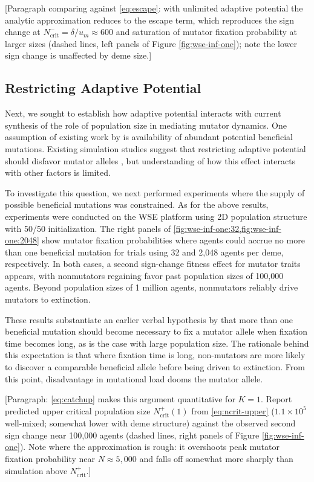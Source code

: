 [Paragraph comparing against \cref{eq:escape}: with unlimited adaptive potential the analytic approximation reduces to the escape term, which reproduces the sign change at $N_\mathrm{crit}^{-} = \delta / u_m \approx 600$ and saturation of mutator fixation probability at larger sizes (dashed lines, left panels of Figure \ref{fig:wse-inf-one}); note the lower sign change is unaffected by deme size.]

\subsection{Restricting Adaptive Potential}
\label{sec:restricting-adaptive-potential}

Next, we sought to establish how adaptive potential interacts with current synthesis of the role of population size in mediating mutator dynamics.
One assumption of existing work by \citet{raynes2018sign} is availability of abundant potential beneficial mutations.
Existing simulation studies suggest that restricting adaptive potential should disfavor mutator alleles \citep{tenaillon1999mutators}, but understanding of how this effect interacts with other factors is limited.

To investigate this question, we next performed experiments where the supply of possible beneficial mutations was constrained.
As for the above results, experiments were conducted on the WSE platform using 2D population structure with 50/50 initialization.
The right panels of \cref{fig:wse-inf-one:32,fig:wse-inf-one:2048} show mutator fixation probabilities where agents could accrue no more than one beneficial mutation for trials using 32 and 2,048 agents per deme, respectively.
In both cases, a second sign-change fitness effect for mutator traits appears, with nonmutators regaining favor past population sizes of 100,000 agents.
Beyond population sizes of 1 million agents, nonmutators reliably drive mutators to extinction.

These results substantiate an earlier verbal hypothesis by \citet{desai2011balance} that more than one beneficial mutation should become necessary to fix a mutator allele when fixation time becomes long, as is the case with large population size.
The rationale behind this expectation is that where fixation time is long, non-mutators are more likely to discover a comparable beneficial allele before being driven to extinction.
From this point, disadvantage in mutational load dooms the mutator allele.

[Paragraph: \cref{eq:catchup} makes this argument quantitative for $K = 1$. Report predicted upper critical population size $N_\mathrm{crit}^{+}(1)$ from \cref{eq:ncrit-upper} ($1.1 \times 10^5$ well-mixed; somewhat lower with deme structure) against the observed second sign change near 100,000 agents (dashed lines, right panels of Figure \ref{fig:wse-inf-one}). Note where the approximation is rough: it overshoots peak mutator fixation probability near $N \approx 5{,}000$ and falls off somewhat more sharply than simulation above $N_\mathrm{crit}^{+}$.]

